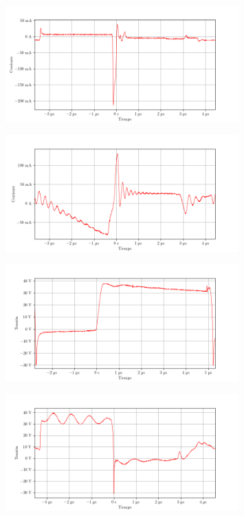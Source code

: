 \begin{figure}[ht]
    \centering
    \includegraphics[width=0.8\textwidth]{images/capturas-osciloscopio/17-11-2022/49.png}
    \caption{}
    \label{fig:osc:49}
\end{figure}

\begin{figure}[ht]
    \centering
    \includegraphics[width=0.8\textwidth]{images/capturas-osciloscopio/17-11-2022/50.png}
    \caption{}
    \label{fig:osc:50}
\end{figure}

\begin{figure}[ht]
    \centering
    \includegraphics[width=0.8\textwidth]{images/capturas-osciloscopio/17-11-2022/51.png}
    \caption{}
    \label{fig:osc:51}
\end{figure}

\begin{figure}[ht]
    \centering
    \includegraphics[width=0.8\textwidth]{images/capturas-osciloscopio/17-11-2022/52.png}
    \caption{}
    \label{fig:osc:52}
\end{figure}


